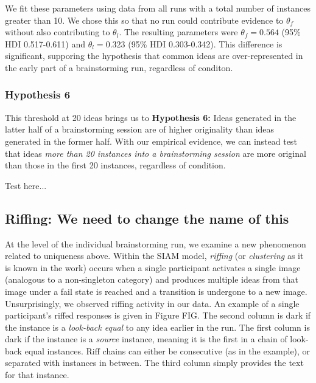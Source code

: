 We fit these parameters using data from all runs with a total number of instances greater than 10. We chose this so that no run could contribute evidence to $\theta_f$ without also contributing to $\theta_l$. The resulting parameters were $\theta_f = 0.564$ (95\% HDI 0.517-0.611) and $\theta_l = 0.323$ (95\% HDI 0.303-0.342). This difference is significant, supporing the hypothesis that common ideas are over-represented in the early part of a brainstorming run, regardless of conditon.


\subsubsection{Hypothesis 6}

This threshold at 20 ideas brings us to \textbf{Hypothesis 6:} Ideas generated in the latter half of a brainstorming session are of higher originality than ideas generated in the former half. With our empirical evidence, we can instead test that ideas \emph{more than 20 instances into a brainstorming session} are more original than those in the first 20 instances, regardless of condition.

Test here...

\subsection{Riffing: We need to change the name of this}

At the level of the individual brainstorming run, we examine a new phenomenon related to uniqueness above. Within the SIAM model, \emph{riffing} (or \emph{clustering} as it is known in the work) occurs when a single participant activates a single image (analogous to a non-singleton category) and produces multiple ideas from that image under a fail state is reached and a transition is undergone to a new image. Unsurprisingly, we observed riffing activity in our data. An example of a single participant's riffed responses is given in Figure FIG. The second column is dark if the instance is a \emph{look-back equal} to any idea earlier in the run. The first column is dark if the instance is a \emph{source} instance, meaning it is the first in a chain of look-back equal instances. Riff chains can either be consecutive (as in the example), or separated with instances in between. The third column simply provides the text for that instance.

